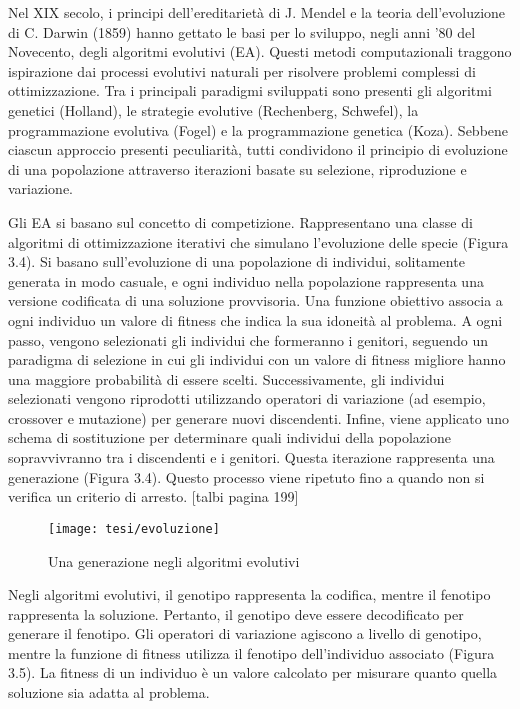 Nel XIX secolo, i principi dell'ereditarietà di J. Mendel e la teoria dell'evoluzione di C. Darwin (1859) hanno gettato le basi per lo sviluppo, negli anni '80 del Novecento, degli algoritmi evolutivi (EA). Questi metodi computazionali traggono ispirazione dai processi evolutivi naturali per risolvere problemi complessi di ottimizzazione. Tra i principali paradigmi sviluppati sono presenti gli algoritmi genetici (Holland), le strategie evolutive (Rechenberg, Schwefel), la programmazione evolutiva (Fogel) e la programmazione genetica (Koza). Sebbene ciascun approccio presenti peculiarità, tutti condividono il principio di evoluzione di una popolazione attraverso iterazioni basate su selezione, riproduzione e variazione.

Gli EA si basano sul concetto di competizione. Rappresentano una classe di algoritmi di ottimizzazione iterativi che simulano l'evoluzione delle specie (Figura 3.4). Si basano sull'evoluzione di una popolazione di individui, solitamente generata in modo casuale, e ogni individuo nella popolazione rappresenta una versione codificata di una soluzione provvisoria. Una funzione obiettivo associa a ogni individuo un valore di fitness che indica la sua idoneità al problema. A ogni passo, vengono selezionati gli individui che formeranno i genitori, seguendo un paradigma di selezione in cui gli individui con un valore di fitness migliore hanno una maggiore probabilità di essere scelti. Successivamente, gli individui selezionati vengono riprodotti utilizzando operatori di variazione (ad esempio, crossover e mutazione) per generare nuovi discendenti. Infine, viene applicato uno schema di sostituzione per determinare quali individui della popolazione sopravvivranno tra i discendenti e i genitori. Questa iterazione rappresenta una generazione (Figura 3.4). Questo processo viene ripetuto fino a quando non si verifica un criterio di arresto. [talbi pagina 199]

\begin{figure}[!ht] 
    \centering 
    \texttt{[image: tesi/evoluzione]} 
    \caption{Una generazione negli algoritmi evolutivi}
\end{figure}

Negli algoritmi evolutivi, il genotipo rappresenta la codifica, mentre il fenotipo rappresenta la soluzione. Pertanto, il genotipo deve essere decodificato per generare il fenotipo. Gli operatori di variazione agiscono a livello di genotipo, mentre la funzione di fitness utilizza il fenotipo dell'individuo associato (Figura 3.5). La fitness di un individuo è un valore calcolato per misurare quanto quella soluzione sia adatta al problema. 


